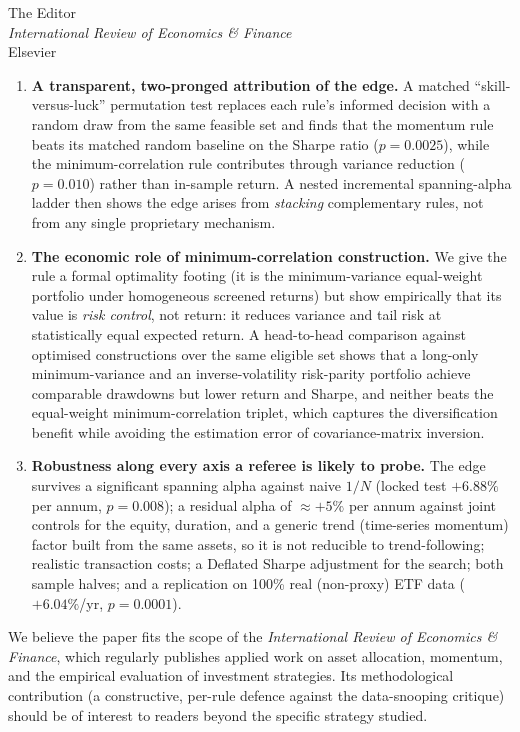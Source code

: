 \documentclass[11pt,a4paper]{letter}
\begin{document}
\begin{letter}{The Editor\\\textit{International Review of Economics \& Finance}\\Elsevier}
\begin{enumerate}\setlength{\itemsep}{2pt}
\item \textbf{A transparent, two-pronged attribution of the edge.} A matched
  ``skill-versus-luck'' permutation test replaces each rule's informed decision
  with a random draw from the same feasible set and finds that the momentum
  rule beats its matched random baseline on the Sharpe ratio ($p=0.0025$), while the
  minimum-correlation rule contributes through variance reduction ($p=0.010$) rather
  than in-sample return. A nested incremental spanning-alpha ladder then shows the edge
  arises from \emph{stacking} complementary rules, not from any single proprietary
  mechanism.
\item \textbf{The economic role of minimum-correlation construction.} We give the
  rule a formal optimality footing (it is the minimum-variance equal-weight
  portfolio under homogeneous screened returns) but show empirically that its value
  is \emph{risk control}, not return: it reduces variance and tail risk at
  statistically equal expected return. A head-to-head comparison against
  optimised constructions over the same eligible set shows that a long-only
  minimum-variance and an inverse-volatility risk-parity portfolio achieve
  comparable drawdowns but lower return and Sharpe, and neither beats the
  equal-weight minimum-correlation triplet, which captures the diversification
  benefit while avoiding the estimation error of covariance-matrix inversion.
\item \textbf{Robustness along every axis a referee is likely to probe.} The edge
  survives a significant spanning alpha against naive $1/N$ (locked test $+6.88\%$
  per annum, $p=0.008$); a residual alpha of $\approx +5\%$ per annum against
  joint controls for the equity, duration, and a generic trend (time-series
  momentum) factor built from the same assets, so it is not reducible to
  trend-following; realistic transaction costs; a Deflated Sharpe adjustment for
  the search; both sample halves; and a replication on 100\% real (non-proxy) ETF
  data ($+6.04\%$/yr, $p=0.0001$).
\end{enumerate}

We believe the paper fits the scope of the \textit{International Review of
Economics \& Finance}, which regularly publishes applied work on asset allocation,
momentum, and the empirical evaluation of investment strategies. Its methodological
contribution (a constructive, per-rule defence against the data-snooping
critique) should be of interest to readers beyond the specific strategy studied.


\end{letter}
\end{document}
